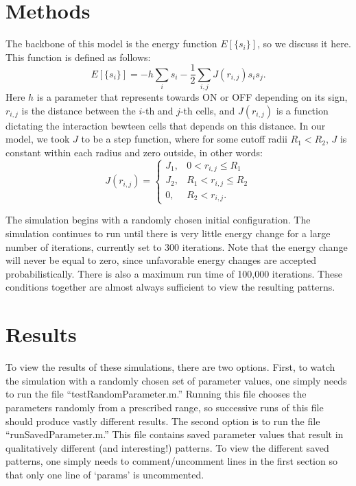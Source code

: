 \documentclass[12pt,letterpaper,cm]{article}
\renewcommand{\.}{\cdot}
\newcommand{\<}{\langle}
\renewcommand{\>}{\rangle}
\begin{document}
	\section*{Methods} 
	
	The backbone of this model is the energy function $E[\{s_i \}]$, so we discuss it here. This function is defined as follows:
	\[E[\{s_i \}] = -h \sum_i s_i - \frac{1}{2} \sum_{i, j} J(r_{i,j}) s_i s_j.  \]
	Here $h$ is a parameter that represents towards ON or OFF depending on its sign, $r_{i,j}$ is the distance between the $i$-th and $j$-th cells, and $J(r_{i,j})$ is a function dictating the interaction bewteen cells that depends on this distance. In our model, we took $J$ to be a step function, where for some cutoff radii $R_1 < R_2$, $J$ is constant within each radius and zero outside, in other words:
	\[J(r_{i,j}) = \begin{cases}
	J_1, & 0 < r_{i,j} \leq R_1\\
	J_2, & R_1 < r_{i,j} \leq R_2\\
	0, & R_2 < r_{i,j}.
	\end{cases} \]
	
	The simulation begins with a randomly chosen initial configuration. The simulation continues to run until there is very little energy change for a large number of iterations, currently set to 300 iterations. Note that the energy change will never be equal to zero, since unfavorable energy changes are accepted probabilistically. There is also a maximum run time of 100,000 iterations. These conditions together are almost always sufficient to view the resulting patterns.
	
	
	
	\section*{Results}	
	
	To view the results of these simulations, there are two options. First, to watch the simulation with a randomly chosen set of parameter values, one simply needs to run the file ``testRandomParameter.m.'' Running this file chooses the parameters randomly from a prescribed range, so successive runs of this file should produce vastly different results. The second option is to run the file ``runSavedParameter.m.'' This file contains saved parameter values that result in qualitatively different (and interesting!) patterns. To view the different saved patterns, one simply needs to comment/uncomment lines in the first section so that only one line of `params' is uncommented.
	
\end{document}
